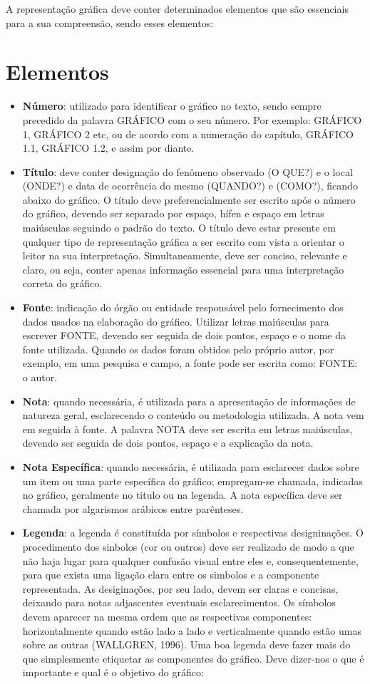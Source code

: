 \inic A representação gráfica deve conter determinados elementos que são essenciais para a sua compreensão, sendo esses elementos:

\newpage

\section{Elementos }

\begin{itemize}
\item \textbf{Número}: utilizado para identificar o gráfico no
texto, sendo sempre precedido da palavra GRÁFICO com o seu número.
Por exemplo: GRÁFICO 1, GRÁFICO 2 etc, ou de acordo com a
numeração do capítulo, GRÁFICO 1.1, GRÁFICO 1.2, e assim por
diante. \item \textbf{Título}: deve conter designação do fenômeno
observado (O QUE?) e o local (ONDE?) e data de ocorrência do mesmo
(QUANDO?) e (COMO?), ficando abaixo do gráfico. O título deve
preferencialmente ser escrito após o número do gráfico, devendo
ser separado por espaço, hífen e espaço em letras maiúsculas
seguindo o padrão do texto. O título deve estar presente em qualquer tipo de representação gráfica a ser escrito com vista a orientar o leitor na sua interpretação. Simultaneamente, deve ser conciso, relevante e claro, ou seja, conter apenas informação essencial para uma interpretação correta do gráfico. 
\item \textbf{Fonte}: indicação do
órgão ou entidade responsável pelo fornecimento dos dados usados
na elaboração do gráfico. Utilizar letras maiúsculas para escrever
FONTE, devendo ser seguida de dois pontos, espaço e o nome da
fonte utilizada. Quando os dados foram obtidos pelo próprio autor,
por exemplo, em uma pesquisa e campo, a fonte pode ser escrita
como: FONTE: o autor. \item \textbf{Nota}: quando necessária, é
utilizada para a apresentação de informações de natureza geral,
esclarecendo o conteúdo ou metodologia utilizada. A nota vem em
seguida à fonte. A palavra NOTA deve ser escrita em letras
maiúsculas, devendo ser seguida de dois pontos, espaço e a
explicação da nota. \item \textbf{Nota Específica}: quando
necessária, é utilizada para esclarecer dados sobre um item ou uma
parte específica do gráfico; empregam-se chamada, indicadas no
gráfico, geralmente no titulo ou na legenda. A nota específica
deve ser chamada por algarismos arábicos entre parênteses.
\item \textbf{Legenda}: a legenda é constituída por símbolos e respectivas designinações. O procedimento dos sinbolos (cor ou outros) deve ser realizado de modo a que não haja lugar para qualquer confusão visual entre eles e, consequentemente, para que exista uma ligação clara entre os simbolos e a componente representada. As desiginações, por seu lado, devem ser claras e concisas, deixando para notas adjascentes eventuais esclarecimentos. Os símbolos devem aparecer na mesma ordem que as respectivas componentes: horizontalmente quando estão lado a lado e verticalmente quando estão umas sobre as outras (WALLGREN, 1996). Uma boa legenda deve fazer mais do que simplesmente etiquetar as componentes do gráfico. Deve dizer-nos o que é importante e qual é o objetivo do gráfico:   

\end{itemize}

